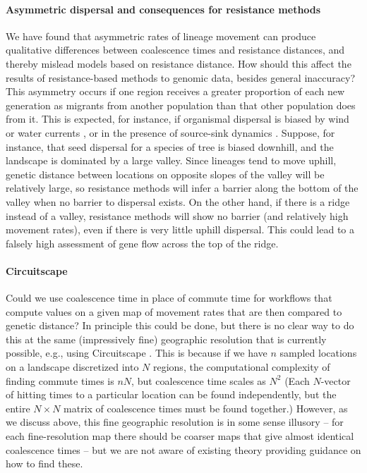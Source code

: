 \documentclass{article}
\begin{document}
\paragraph{Asymmetric dispersal and consequences for resistance methods}
We have found that asymmetric rates of lineage movement
can produce qualitative differences between coalescence times and resistance distances,
and thereby mislead models based on resistance distance.
How should this affect the results of resistance-based methods to genomic data,
besides general inaccuracy?
This asymmetry occurs if one region receives a greater proportion of each new generation as migrants
from another population than that other population does from it.
This is expected, for instance,
if organismal dispersal is biased by wind or water currents \citep{gaines2003avoiding,morrissey2009maintenance},
or in the presence of source-sink dynamics \citep{dias1996sources,lenormand2002limits}.
Suppose, for instance, that seed dispersal for a species of tree
is biased downhill,
and the landscape is dominated by a large valley.
Since lineages tend to move uphill,
genetic distance between locations on opposite slopes of the valley will be relatively large,
so resistance methods will infer a barrier along the bottom of the valley
when no barrier to dispersal exists.
On the other hand, if there is a ridge instead of a valley,
resistance methods will show no barrier (and relatively high movement rates),
even if there is very little uphill dispersal.
This could lead to a falsely high assessment of gene flow across the top of the ridge.

\paragraph{Circuitscape}
Could we use coalescence time in place of commute time
for workflows that compute values on a given map of movement rates
that are then compared to genetic distance?
In principle this could be done,
but there is no clear way to do this 
at the same (impressively fine) geographic resolution that is currently possible,
e.g., using Circuitscape \citep{mcrae2006isolation}.
This is because if we have $n$ sampled locations
on a landscape discretized into $N$ regions,
the computational complexity of finding commute times is $nN$,
but coalescence time scales as $N^2$
(Each $N$-vector of hitting times to a particular location can be found independently,
but the entire $N \times N$ matrix of coalescence times must be found together.)
However, as we discuss above, this fine geographic resolution is in some sense illusory --
for each fine-resolution map there should be coarser maps that give almost identical coalescence times --
but we are not aware of existing theory providing guidance on how to find these.
\end{document}

